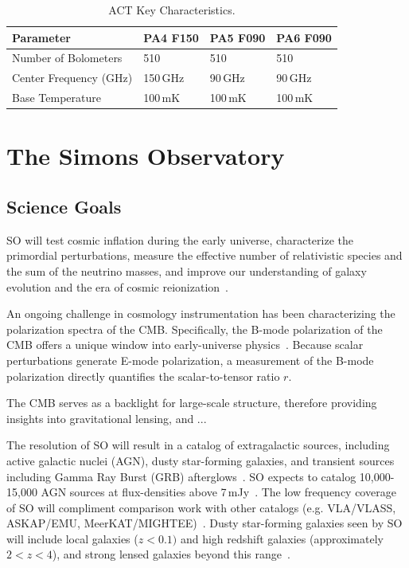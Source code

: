 \begin{table}[t]
    \centering
    \begin{tabular}{|l|l|l|l|} \hline
        \textbf{ Parameter} &  \textbf{PA4 F150} &  \textbf{PA5 F090}  &  \textbf{PA6 F090}  \\ \hline \hline
        Number of Bolometers & 510 & 510 & 510\\\hline
        Center Frequency (GHz) & 150\,GHz & 90\,GHz & 90\,GHz\\\hline
        Base Temperature & 100\,mK & 100\,mK & 100\,mK\\\hline
    \end{tabular} \caption{ACT Key Characteristics.}
    \label{tab:act}
\end{table}

\section{The Simons Observatory}

\subsection{Science Goals}

SO will test cosmic inflation during the early universe, characterize the primordial perturbations, measure the effective number of relativistic species and the sum of the neutrino masses, and improve our understanding of galaxy evolution and the era of cosmic reionization~\citep{so19,so_science}. 

An ongoing challenge in cosmology instrumentation has been characterizing the polarization spectra of the CMB.  Specifically, the B-mode polarization of the CMB offers a unique window into early-universe physics~\cite{}.  Because scalar perturbations generate E-mode polarization, a measurement of the B-mode polarization directly quantifies the scalar-to-tensor ratio $r$.

The CMB serves as a backlight for large-scale structure, therefore providing insights into gravitational lensing, and ...

The resolution of SO will result in a catalog of extragalactic sources, including active galactic nuclei (AGN), dusty star-forming galaxies, and transient sources including Gamma Ray Burst (GRB) afterglows~\cite{so_science}.  SO expects to catalog 10,000-15,000 AGN sources at flux-densities above 7\,mJy~\cite{Tucci_2011}.  The low frequency coverage of SO will compliment comparison work with other catalogs (e.g. VLA/VLASS, ASKAP/EMU, MeerKAT/MIGHTEE)~\cite{so_science}.  Dusty star-forming galaxies seen by SO will include local galaxies ($z<0.1)$ and high redshift galaxies (approximately $2<z<4$), and strong lensed galaxies beyond this range~\cite{Marrone_2017}.


